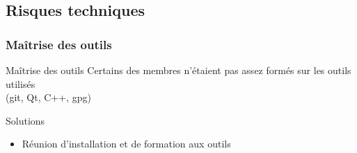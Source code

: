   \subsection{Risques techniques}
    \begin{frame}
      \frametitle{\color{white}Maîtrise des outils}
      \begin{block}{Maîtrise des outils}
        Certains des membres n'étaient pas assez formés sur les outils utilisés\\
        (git, Qt, C++, gpg)
      \end{block}
      
      \begin{exampleblock}{Solutions}
        \begin{itemize}
          \item Réunion d'installation et de formation aux outils
        \end{itemize}
      \end{exampleblock}
    \end{frame}
